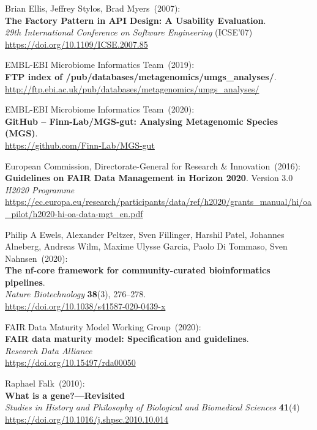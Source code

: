 \begin{thebibliography}{9}
Brian Ellis, Jeffrey Stylos, Brad Myers~(2007):\\
\textbf{The Factory Pattern in API Design: A Usability Evaluation}.\\
\emph{29th International Conference on Software Engineering} (ICSE'07)\\
\url{https://doi.org/10.1109/ICSE.2007.85}

EMBL-EBI Microbiome Informatics Team~(2019): \\
\textbf{FTP index of /pub/databases/metagenomics/umgs\_analyses/}.\\
\url{http://ftp.ebi.ac.uk/pub/databases/metagenomics/umgs_analyses/}

EMBL-EBI Microbiome Informatics Team~(2020): \\
\textbf{GitHub -- Finn-Lab/MGS-gut: Analysing Metagenomic Species (MGS)}.\\
\url{https://github.com/Finn-Lab/MGS-gut}

European Commission, Directorate-General for Research \& Innovation~(2016): \\
\textbf{Guidelines on FAIR Data Management in Horizon 2020}. Version 3.0\\
\emph{H2020 Programme}\\
\url{https://ec.europa.eu/research/participants/data/ref/h2020/grants_manual/hi/oa_pilot/h2020-hi-oa-data-mgt_en.pdf}

Philip A Ewels, Alexander Peltzer, Sven Fillinger, Harshil Patel, Johannes Alneberg, Andreas Wilm, Maxime Ulysse Garcia, Paolo Di Tommaso, Sven Nahnsen~(2020): \\
\textbf{The nf-core framework for community-curated bioinformatics pipelines}.\\
\emph{Nature Biotechnology} \textbf{38}(3), 276--278.\\
\url{https://doi.org/10.1038/s41587-020-0439-x}

FAIR Data Maturity Model Working Group~(2020): \\
\textbf{FAIR data maturity model: Specification and guidelines}.\\
\emph{Research Data Alliance}\\
\url{https://doi.org/10.15497/rda00050}

Raphael Falk~(2010):\\
\textbf{What is a gene?—Revisited} \\
\emph{Studies in History and Philosophy of Biological and Biomedical Sciences} \textbf{41}(4) \\ 
\url{https://doi.org/10.1016/j.shpsc.2010.10.014}


\end{thebibliography}
